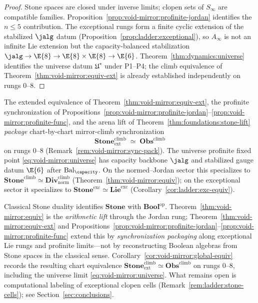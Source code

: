 \begin{proof}
Stone spaces are closed under inverse limits; clopen sets of $S_\infty$ are
compatible families. Proposition~\ref{prop:void-mirror:profinite-jordan}
identifies the $n\leq5$ contribution. The exceptional rungs form a finite
cyclic extension of the stabilized $\jalg$ datum
(Proposition~\ref{prop:ladder:exceptional}), so $A_\infty$ is not an infinite
Lie extension but the capacity-balanced stabilization
$\jalg\to\E{8}\to\E{8}\times\E{8}\to\E{6}$. Theorem~\ref{thm:dynamics:universe}
identifies the universe datum $\mathfrak{U}^\star$ under P1--P4; the climb
equivalence of Theorem~\ref{thm:void-mirror:equiv-ext} is already established
independently on rungs $0$--$8$.
\end{proof}

\begin{corollary}\label{cor:void-mirror:global-equiv}
The extended equivalence of Theorem~\ref{thm:void-mirror:equiv-ext}, the
profinite synchronization of
Propositions~\ref{prop:void-mirror:profinite-jordan}--\ref{prop:void-mirror:profinite-func},
and the arena lift of Theorem~\ref{thm:foundations:stone-lift} \emph{package}
chart-by-chart mirror-climb synchronization
\[
  \mathbf{Stone}^{\mathrm{climb}}_{\mathrm{ext}}\;\simeq\;\mathbf{Obs}^{\mathrm{climb}}
\]
on rungs $0$--$8$ (Remark~\ref{rem:void-mirror:sync-pack}). The universe profinite fixed point
\eqref{eq:void-mirror:universe} has capacity backbone $\jalg$ and stabilized
gauge datum $\E{6}$ after $\mathrm{Bal}_\capacity$. On the normed--Jordan
sector this specializes to
$\mathbf{Stone}^{\mathrm{climb}}\simeq\mathbf{Div}^{\mathrm{climb}}_{\mathrm{norm}}$
(Theorem~\ref{thm:void-mirror:equiv}); on the exceptional sector it specializes
to $\mathbf{Stone}^{\mathrm{exc}}\simeq\mathbf{Lie}^{\mathrm{exc}}$
(Corollary~\ref{cor:ladder:exc-equiv}).
\end{corollary}

\begin{remark}\label{rem:void-mirror:stone-duality}
Classical Stone duality identifies $\mathbf{Stone}$ with $\mathbf{Bool}^{\mathrm{op}}$.
Theorem~\ref{thm:void-mirror:equiv} is the \emph{arithmetic lift} through the
Jordan rung; Theorem~\ref{thm:void-mirror:equiv-ext} and
Propositions~\ref{prop:void-mirror:profinite-jordan}--\ref{prop:void-mirror:profinite-func}
extend this by \emph{synchronization packaging} along exceptional Lie rungs and
profinite limits---not by reconstructing Boolean algebras from Stone spaces in
the classical sense. Corollary~\ref{cor:void-mirror:global-equiv} records the
resulting chart equivalence
$\mathbf{Stone}^{\mathrm{climb}}_{\mathrm{ext}}\simeq\mathbf{Obs}^{\mathrm{climb}}$
on rungs $0$--$8$, including the universe limit \eqref{eq:void-mirror:universe}.
What remains open is computational labeling of exceptional clopen cells
(Remark~\ref{rem:ladder:stone-cells}); see Section~\ref{sec:conclusions}.
\end{remark}

